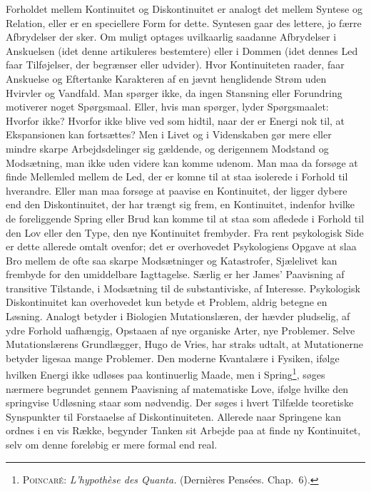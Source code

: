 \documentclass[12pt]{article}
\newcommand{\opage}[1]{\marginnote{\footnotesize\textit{[#1]}}}
\begin{document}
Forholdet mellem Kontinuitet og Diskontinuitet er analogt
det mellem Syntese og Relation, eller er en speciellere
\opage{29} Form for dette. Syntesen gaar des lettere, jo færre Afbrydelser
der sker. Om muligt optages uvilkaarlig saadanne
Afbrydelser i Anskuelsen (idet denne artikuleres bestemtere)
eller i Dommen (idet dennes Led faar Tilføjelser, der begrænser
eller udvider). Hvor Kontinuiteten raader, faar Anskuelse
og Eftertanke Karakteren af en jævnt henglidende
Strøm uden Hvirvler og Vandfald. Man spørger ikke, da
ingen Stansning eller Forundring motiverer noget Spørgsmaal.
Eller, hvis man spørger, lyder Spørgsmaalet: Hvorfor
ikke? Hvorfor ikke blive ved som hidtil, naar der er
Energi nok til, at Ekspansionen kan fortsættes? Men i
Livet og i Videnskaben gør mere eller mindre skarpe Arbejdsdelinger
sig gældende, og derigennem Modstand og
Modsætning, man ikke uden videre kan komme udenom.
Man maa da forsøge at finde Mellemled mellem de Led,
der er komne til at staa isolerede i Forhold til hverandre.
Eller man maa forsøge at paavise en Kontinuitet, der ligger
dybere end den Diskontinuitet, der har trængt sig frem,
en Kontinuitet, indenfor hvilke de foreliggende Spring eller
Brud kan komme til at staa som afledede i Forhold til
den Lov eller den Type, den nye Kontinuitet frembyder.
Fra rent psykologisk Side er dette allerede omtalt ovenfor;
det er overhovedet Psykologiens Opgave at slaa Bro mellem
de ofte saa skarpe Modsætninger og Katastrofer, Sjælelivet
kan frembyde for den umiddelbare Iagttagelse. Særlig
er her James' Paavisning af \guillemotright transitive\guillemotleft{} Tilstande, i
Modsætning til de \guillemotright substantiviske\guillemotleft, af Interesse. Psykologisk
Diskontinuitet kan overhovedet kun betyde et Problem,
aldrig betegne en Løsning. Analogt betyder i Biologien
Mutationslæren, der hævder pludselig, af ydre Forhold
uafhængig, Opstaaen af nye organiske Arter, nye Problemer.
Selve Mutationslærens Grundlægger, Hugo de Vries,
\opage{30} \setcounter{footnote}{0}
har straks udtalt, at Mutationerne betyder ligesaa mange
Problemer. Den moderne Kvantalære i Fysiken, ifølge
hvilken Energi ikke udløses paa kontinuerlig Maade, men
i Spring\footnote{\textsc{Poincaré}: \textit{L'hypothèse des Quanta.}
(Dernières Pensées. Chap.~6).}, søges nærmere begrundet gennem Paavisning af
matematiske Love, ifølge hvilke den springvise Udløsning
staar som nødvendig. Der søges i hvert Tilfælde teoretiske
Synspunkter til Forstaaelse af Diskontinuiteten. Allerede
naar Springene kan ordnes i en vis Række, begynder Tanken
sit Arbejde paa at finde ny Kontinuitet, selv om denne
foreløbig er mere formal end real.
\end{document}
